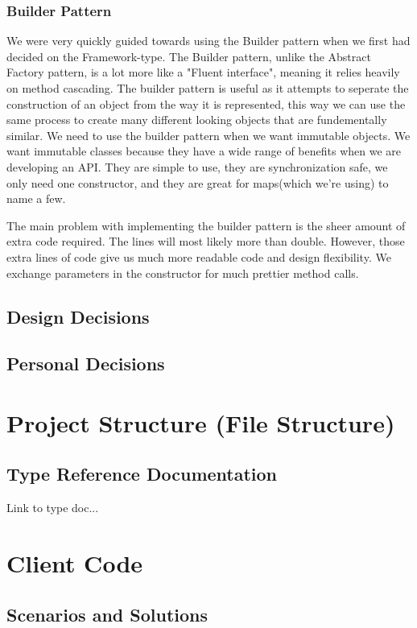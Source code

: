 \documentclass[12pt]{article}
\begin{document}
\subsubsection{Builder Pattern}
We were very quickly guided towards using the Builder pattern when we first had decided on the Framework-type. The Builder pattern, unlike the Abstract Factory pattern, is a lot more like a "Fluent interface", meaning it relies heavily on method cascading.
The builder pattern is useful as it attempts to seperate the construction of an object from the way it is represented, this way we can use the same process to create many different looking objects that are fundementally similar.
We need to use the builder pattern when we want immutable objects. We want immutable classes because they have a wide range of benefits when we are developing an API. They are simple to use, they are synchronization safe, we only need one constructor, and they are great for maps(which we're using) to name a few.

The main problem with implementing the builder pattern is the sheer amount of extra code required. The lines will most likely more than double. However, those extra lines of code give us much more readable code and design flexibility. We exchange parameters in the constructor for much prettier method calls.


\subsection{Design Decisions}

\subsection{Personal Decisions}

\section{Project Structure (File Structure)}

\subsection{Type Reference Documentation}
Link to type doc...

\section{Client Code}

\subsection{Scenarios and Solutions}
\end{document}
